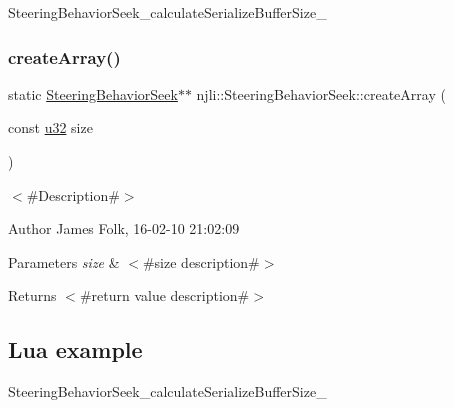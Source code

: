\begin{DoxyCodeInclude}
\end{DoxyCodeInclude}
Steering\+Behavior\+Seek\+\_\+calculate\+Serialize\+Buffer\+Size\+\_\+ \mbox{\label{classnjli_1_1_steering_behavior_seek_ac9ad7111b7a6ca096d65cb545482738e}} 
\subsubsection{\texorpdfstring{create\+Array()}{createArray()}}
{\footnotesize\ttfamily static \mbox{\hyperlink{classnjli_1_1_steering_behavior_seek}{Steering\+Behavior\+Seek}}$\ast$$\ast$ njli\+::\+Steering\+Behavior\+Seek\+::create\+Array (\begin{DoxyParamCaption}\item[{const \mbox{\hyperlink{_util_8h_a10e94b422ef0c20dcdec20d31a1f5049}{u32}}}]{size }\end{DoxyParamCaption})\hspace{0.3cm}{\ttfamily [static]}}



$<$\#\+Description\#$>$ 

\begin{DoxyAuthor}{Author}
James Folk, 16-\/02-\/10 21\+:02\+:09
\end{DoxyAuthor}

\begin{DoxyParams}{Parameters}
{\em size} & $<$\#size description\#$>$\\
\hline
\end{DoxyParams}
\begin{DoxyReturn}{Returns}
$<$\#return value description\#$>$
\end{DoxyReturn}
\hypertarget{classnjli_1_1_steering_behavior_wander_ex1}{}\subsection{Lua example}\label{classnjli_1_1_steering_behavior_wander_ex1}

\begin{DoxyCodeInclude}
\end{DoxyCodeInclude}
Steering\+Behavior\+Seek\+\_\+calculate\+Serialize\+Buffer\+Size\+\_\+ \mbox{\label{classnjli_1_1_steering_behavior_seek_a16ed9e922ca030f1c3bd27c04133cf8f}} 
